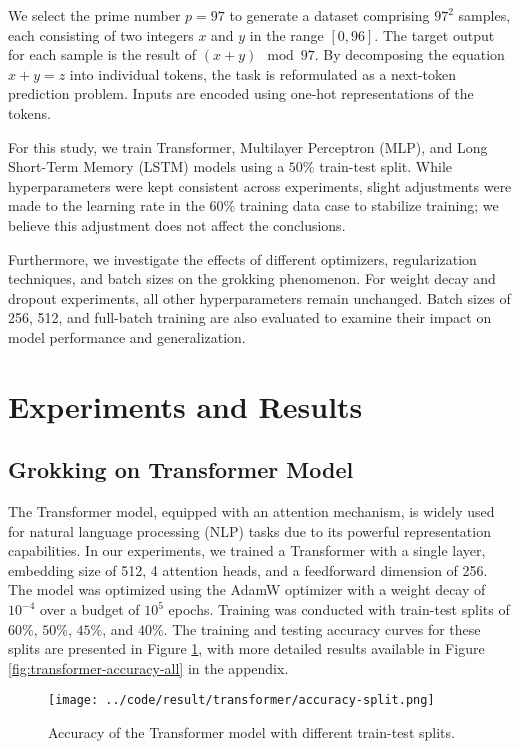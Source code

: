 \documentclass{article}
\begin{document}
We select the prime number $p = 97$ to generate a dataset comprising $97^2$ samples, each consisting of two integers $x$ and $y$ in the range $[0, 96]$. The target output for each sample is the result of $(x + y) \mod 97$. By decomposing the equation $x + y = z$ into individual tokens, the task is reformulated as a next-token prediction problem. Inputs are encoded using one-hot representations of the tokens.

For this study, we train Transformer, Multilayer Perceptron (MLP), and Long Short-Term Memory (LSTM) models using a $50\%$ train-test split. While hyperparameters were kept consistent across experiments, slight adjustments were made to the learning rate in the $60\%$ training data case to stabilize training; we believe this adjustment does not affect the conclusions.

Furthermore, we investigate the effects of different optimizers, regularization techniques, and batch sizes on the grokking phenomenon. For weight decay and dropout experiments, all other hyperparameters remain unchanged. Batch sizes of 256, 512, and full-batch training are also evaluated to examine their impact on model performance and generalization.

\section{Experiments and Results}

\subsection{Grokking on Transformer Model}
The Transformer model, equipped with an attention mechanism, is widely used for natural language processing (NLP) tasks due to its powerful representation capabilities. In our experiments, we trained a Transformer with a single layer, embedding size of 512, 4 attention heads, and a feedforward dimension of 256. The model was optimized using the AdamW optimizer with a weight decay of $10^{-4}$ over a budget of $10^5$ epochs. Training was conducted with train-test splits of $60\%$, $50\%$, $45\%$, and $40\%$. The training and testing accuracy curves for these splits are presented in Figure \ref{fig:transformer-accuracy}, with more detailed results available in Figure \ref{fig:transformer-accuracy-all} in the appendix.

\begin{figure}[ht]
    \centering
    \texttt{[image: ../code/result/transformer/accuracy-split.png]}
    \caption{Accuracy of the Transformer model with different train-test splits.}
    \label{fig:transformer-accuracy}
\end{figure}
\end{document}
